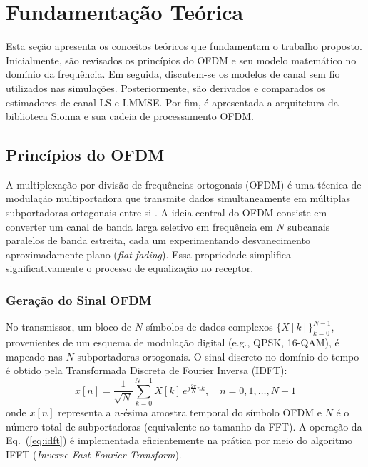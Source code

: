 \documentclass[conference]{IEEEtran}
\begin{document}
\section{Fundamentação Teórica}

Esta seção apresenta os conceitos teóricos que fundamentam o trabalho proposto. Inicialmente, são revisados os princípios do OFDM e seu modelo matemático no domínio da frequência. Em seguida, discutem-se os modelos de canal sem fio utilizados nas simulações. Posteriormente, são derivados e comparados os estimadores de canal LS e LMMSE. Por fim, é apresentada a arquitetura da biblioteca Sionna e sua cadeia de processamento OFDM.

\subsection{Princípios do OFDM}

A multiplexação por divisão de frequências ortogonais (OFDM) é uma técnica de modulação multiportadora que transmite dados simultaneamente em múltiplas subportadoras ortogonais entre si \cite{goldsmith2005, proakis2008}. A ideia central do OFDM consiste em converter um canal de banda larga seletivo em frequência em $N$ subcanais paralelos de banda estreita, cada um experimentando desvanecimento aproximadamente plano (\textit{flat fading}). Essa propriedade simplifica significativamente o processo de equalização no receptor.

\subsubsection{Geração do Sinal OFDM}

No transmissor, um bloco de $N$ símbolos de dados complexos $\{X[k]\}_{k=0}^{N-1}$, provenientes de um esquema de modulação digital (e.g., QPSK, 16-QAM), é mapeado nas $N$ subportadoras ortogonais. O sinal discreto no domínio do tempo é obtido pela Transformada Discreta de Fourier Inversa (IDFT):
\begin{equation}
    x[n] = \frac{1}{\sqrt{N}} \sum_{k=0}^{N-1} X[k] \, e^{j \frac{2\pi}{N} nk}, \quad n = 0, 1, \ldots, N-1
    \label{eq:idft}
\end{equation}
onde $x[n]$ representa a $n$-ésima amostra temporal do símbolo OFDM e $N$ é o número total de subportadoras (equivalente ao tamanho da FFT). A operação da Eq.~(\ref{eq:idft}) é implementada eficientemente na prática por meio do algoritmo IFFT (\textit{Inverse Fast Fourier Transform}).
\end{document}
